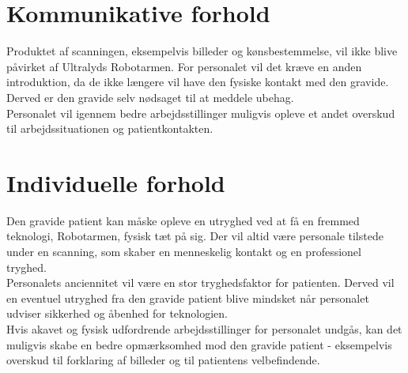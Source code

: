 \section{Kommunikative forhold}
Produktet af scanningen, eksempelvis billeder og kønsbestemmelse, vil ikke blive påvirket af Ultralyds Robotarmen.
For personalet vil det kræve en anden introduktion, da de ikke længere vil have den fysiske kontakt med den gravide. Derved er den gravide selv nødsaget til at meddele ubehag.  \\
Personalet vil igennem bedre arbejdsstillinger muligvis opleve et andet overskud til arbejdssituationen og patientkontakten.  

\section{Individuelle forhold}
Den gravide patient kan måske opleve en utryghed ved at få en fremmed teknologi, Robotarmen, fysisk tæt på sig. Der vil altid være personale tilstede under en scanning, som skaber en menneskelig kontakt og en professionel tryghed.  \\
Personalets anciennitet vil være en stor tryghedsfaktor for patienten. Derved vil en eventuel utryghed fra den gravide patient blive mindsket når personalet udviser sikkerhed og åbenhed for teknologien.\\  
Hvis akavet og fysisk udfordrende arbejdsstillinger for personalet undgås, kan det muligvis skabe en bedre opmærksomhed mod den gravide patient - eksempelvis overskud til forklaring af billeder og til patientens velbefindende.  

